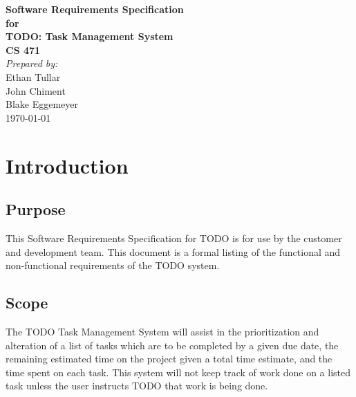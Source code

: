 \documentclass[12pt,a4paper]{article}
\begin{document}
\begin{titlepage}
\begin{flushright} 
{\LARGE \bfseries Software Requirements Specification}\\[1.2cm]
{\large \bfseries for}\\[1.2cm]
{\huge \bfseries TODO: Task Management System}\\[1.2cm]
{\large \bfseries CS 471}\\
\vfill
\emph{Prepared by:} \\
Ethan Tullar\\
John Chiment\\
Blake Eggemeyer \\ [3cm]
{\large \today}
\end{flushright}
\end{titlepage}
\setcounter{tocdepth}{3}
\setcounter{secnumdepth}{4}
\tableofcontents
\newpage
\section{Introduction}
\subsection{Purpose}
This Software Requirements Specification for TODO is for use by the customer and development team. This document is a formal listing of the functional and non-functional requirements of the TODO system.
\subsection{Scope}
The TODO Task Management System will assist in the prioritization and alteration of a list of tasks which are to be completed by a given due date, the remaining estimated time on the project given a total time estimate, and the time spent on each task. This system will not keep track of work done on a listed task unless the user instructs TODO that work is being done.
\end{document}
